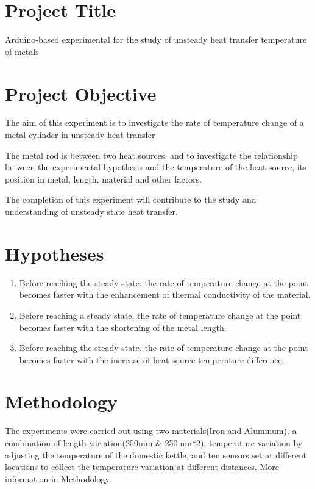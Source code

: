 \documentclass[12pt]{article}
\numberwithin{equation}{section}
\begin{document}
\section{Project Title} Arduino-based experimental for the study of unsteady heat transfer temperature of metals
\section{Project Objective} 

The aim of this experiment is to investigate the rate of temperature change of a metal cylinder in unsteady heat transfer 


The metal rod is between two heat sources, and to investigate the relationship between the experimental hypothesis and the temperature of the heat source, its position in metal, length, material and other factors. 


The completion of this experiment will contribute to the study and understanding of unsteady state heat transfer.



\section{Hypotheses}

\begin{enumerate}
  \item Before reaching the steady state, the rate of temperature change at the point becomes faster with the enhancement of thermal conductivity of the material.
  \item Before reaching a steady state, the rate of temperature change at the point becomes faster with the shortening of the metal length.
  \item Before reaching the steady state, the rate of temperature change at the point becomes faster with the increase of heat source temperature difference.
\end{enumerate}

\section{Methodology}
The experiments were carried out using two materials(Iron and Aluminum), a combination of length variation(250mm \& 250mm*2), temperature variation by adjusting the temperature of the domestic kettle, and ten sensors set at different locations to collect the temperature variation at different distances. More information in Methodology.
\end{document}
